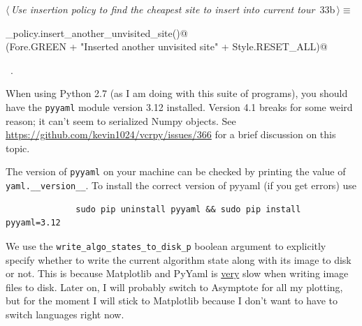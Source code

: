 \documentclass[11.5pt]{report}
\begin{document}
\begin{flushleft} \small\label{scrap36}\raggedright\small
{} $\langle\,${\itshape Use insertion policy to find the cheapest site to insert into current tour}\nobreak\ {\footnotesize {33b}}$\,\rangle\equiv$
\vspace{-1ex}
\begin{list}{}{} \item
\mbox{}\verb@insertion_policy.insert_another_unvisited_site()@\\
\mbox{}\verb@debug(Fore.GREEN + "Inserted another unvisited site" + Style.RESET_ALL)@\\
\mbox{}\verb@@{\NWsep}
\end{list}
\vspace{-1.5ex}
\footnotesize
\begin{list}{}{\setlength{\itemsep}{-\parsep}\setlength{\itemindent}{-\leftmargin}}
\item \NWtxtMacroRefIn\ .

\item{}
\end{list}
\vspace{4ex}
\end{flushleft}

\vspace{-0.8cm}\newchunk When using Python 2.7 (as I am doing with this suite of programs), you should have the 
\texttt{pyyaml} module version 3.12 installed. Version 4.1 breaks for some weird reason; it can't seem to serialized
Numpy objects. See \url{https://github.com/kevin1024/vcrpy/issues/366} for a brief discussion on this topic. 

The version of \verb|pyyaml| on your machine can be checked by printing the value of \verb|yaml.__version__|. 
To install the correct version of pyyaml (if you get errors)  use

\begin{verbatim} 
              sudo pip uninstall pyyaml && sudo pip install pyyaml=3.12
\end{verbatim}

\newchunk We use the \verb|write_algo_states_to_disk_p| boolean argument to explicitly specify whether to write 
the current algorithm state along with its image to disk or not. This is because Matplotlib and PyYaml
is \underline{very} slow when writing image files to disk. Later on, I will probably switch to Asymptote 
for all my plotting, but for the moment I will stick to Matplotlib because I don't want to have to switch languages right now. 
 
\end{document}
